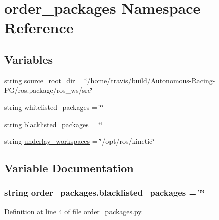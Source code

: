 \hypertarget{namespaceorder__packages}{}\section{order\+\_\+packages Namespace Reference}
\label{namespaceorder__packages}
\subsection*{Variables}
\begin{DoxyCompactItemize}
\item 
string \hyperlink{namespaceorder__packages_aff4fd297841de7fbddc2c0c33a6bab21}{source\+\_\+root\+\_\+dir} = \char`\"{}/home/travis/build/Autonomous-\/Racing-\/PG/ros.\+package/ros\+\_\+ws/src\char`\"{}
\item 
string \hyperlink{namespaceorder__packages_a84450a73e77dbf3689293b97dcb697a4}{whitelisted\+\_\+packages} = \char`\"{}\char`\"{}
\item 
string \hyperlink{namespaceorder__packages_a29ea913f00c5a0e81d3c7688e7375507}{blacklisted\+\_\+packages} = \char`\"{}\char`\"{}
\item 
string \hyperlink{namespaceorder__packages_a11d102ff09fd2977b9075c4c722015d2}{underlay\+\_\+workspaces} = \char`\"{}/opt/ros/kinetic\char`\"{}
\end{DoxyCompactItemize}


\subsection{Variable Documentation}
\subsubsection[{\texorpdfstring{blacklisted\+\_\+packages}{blacklisted_packages}}]{\setlength{\rightskip}{0pt plus 5cm}string order\+\_\+packages.\+blacklisted\+\_\+packages = \char`\"{}\char`\"{}}\hypertarget{namespaceorder__packages_a29ea913f00c5a0e81d3c7688e7375507}{}\label{namespaceorder__packages_a29ea913f00c5a0e81d3c7688e7375507}


Definition at line 4 of file order\+\_\+packages.\+py.

